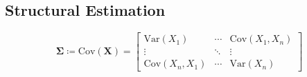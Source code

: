 
\subsection{Structural Estimation}
\label{sec:structural}

\blindmathfalse
\Blindtext[1]

\[
	\mathbfup{\Sigma} \coloneqq
	\mathup{Cov}(\mathbf{X}) =
	\begin{bmatrix}
		\mathup{Var}(X_1)      & \cdots & \mathup{Cov}(X_1, X_n) \\[-2.5pt]
		\vdots                 & \ddots & \vdots                 \\
		\mathup{Cov}(X_n, X_1) & \cdots & \mathup{Var}(X_n)
	\end{bmatrix}
\]